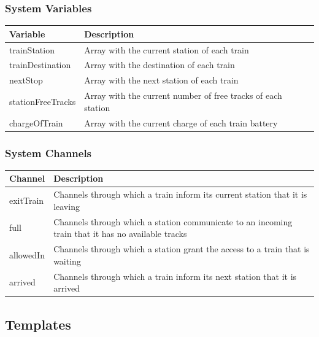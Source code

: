 \subsubsection{System Variables}
\begin{table} [H]
    \begin{tabu} to \textwidth {|X|X[2]|}
    \hline
    \textbf{Variable}          & \textbf{Description} \\  \hline
    trainStation                & Array with the current station of each train \\  \hline
    trainDestination            & Array with the destination of each train \\   \hline
    nextStop                    & Array with the next station of each train \\  \hline
    stationFreeTracks           & Array with the current number of free tracks of each station \\   \hline
    chargeOfTrain               & Array with the current charge of each train battery \\    \hline
    \end{tabu}
\end{table}
\bigskip

\subsubsection{System Channels}
\begin{table} [H]
    \begin{tabu} to \textwidth {|X|X[2]|}
    \hline
    \textbf{Channel}          & \textbf{Description} \\  \hline
    exitTrain                   & Channels through which a train inform its current station that it is leaving \\  \hline
    full                        & Channels through which a station communicate to an incoming train that it has no available tracks\\  \hline
    allowedIn                   & Channels through which a station grant the access to a train that is waiting \\ \hline
    arrived                     & Channels through which a train inform its next station that it is arrived\\ \hline
    \end{tabu}
\end{table}

\newpage

\subsection{Templates}
